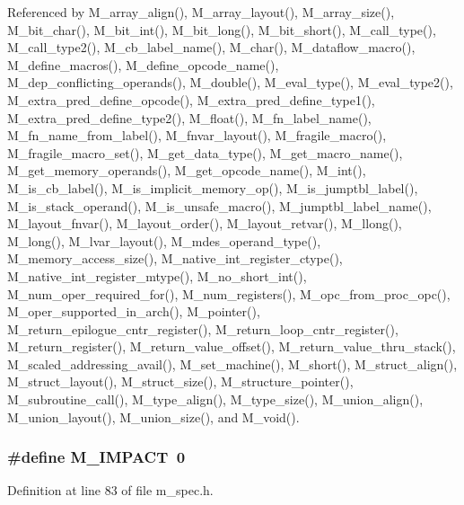 Referenced by M\_\-array\_\-align(), M\_\-array\_\-layout(), M\_\-array\_\-size(), M\_\-bit\_\-char(), M\_\-bit\_\-int(), M\_\-bit\_\-long(), M\_\-bit\_\-short(), M\_\-call\_\-type(), M\_\-call\_\-type2(), M\_\-cb\_\-label\_\-name(), M\_\-char(), M\_\-dataflow\_\-macro(), M\_\-define\_\-macros(), M\_\-define\_\-opcode\_\-name(), M\_\-dep\_\-conflicting\_\-operands(), M\_\-double(), M\_\-eval\_\-type(), M\_\-eval\_\-type2(), M\_\-extra\_\-pred\_\-define\_\-opcode(), M\_\-extra\_\-pred\_\-define\_\-type1(), M\_\-extra\_\-pred\_\-define\_\-type2(), M\_\-float(), M\_\-fn\_\-label\_\-name(), M\_\-fn\_\-name\_\-from\_\-label(), M\_\-fnvar\_\-layout(), M\_\-fragile\_\-macro(), M\_\-fragile\_\-macro\_\-set(), M\_\-get\_\-data\_\-type(), M\_\-get\_\-macro\_\-name(), M\_\-get\_\-memory\_\-operands(), M\_\-get\_\-opcode\_\-name(), M\_\-int(), M\_\-is\_\-cb\_\-label(), M\_\-is\_\-implicit\_\-memory\_\-op(), M\_\-is\_\-jumptbl\_\-label(), M\_\-is\_\-stack\_\-operand(), M\_\-is\_\-unsafe\_\-macro(), M\_\-jumptbl\_\-label\_\-name(), M\_\-layout\_\-fnvar(), M\_\-layout\_\-order(), M\_\-layout\_\-retvar(), M\_\-llong(), M\_\-long(), M\_\-lvar\_\-layout(), M\_\-mdes\_\-operand\_\-type(), M\_\-memory\_\-access\_\-size(), M\_\-native\_\-int\_\-register\_\-ctype(), M\_\-native\_\-int\_\-register\_\-mtype(), M\_\-no\_\-short\_\-int(), M\_\-num\_\-oper\_\-required\_\-for(), M\_\-num\_\-registers(), M\_\-opc\_\-from\_\-proc\_\-opc(), M\_\-oper\_\-supported\_\-in\_\-arch(), M\_\-pointer(), M\_\-return\_\-epilogue\_\-cntr\_\-register(), M\_\-return\_\-loop\_\-cntr\_\-register(), M\_\-return\_\-register(), M\_\-return\_\-value\_\-offset(), M\_\-return\_\-value\_\-thru\_\-stack(), M\_\-scaled\_\-addressing\_\-avail(), M\_\-set\_\-machine(), M\_\-short(), M\_\-struct\_\-align(), M\_\-struct\_\-layout(), M\_\-struct\_\-size(), M\_\-structure\_\-pointer(), M\_\-subroutine\_\-call(), M\_\-type\_\-align(), M\_\-type\_\-size(), M\_\-union\_\-align(), M\_\-union\_\-layout(), M\_\-union\_\-size(), and M\_\-void().
\subsubsection{\setlength{\rightskip}{0pt plus 5cm}\#define M\_\-IMPACT~0}\label{m__spec_8h_5074e0dfb0605189d30ef2dbe0948343}




Definition at line 83 of file m\_\-spec.h.


